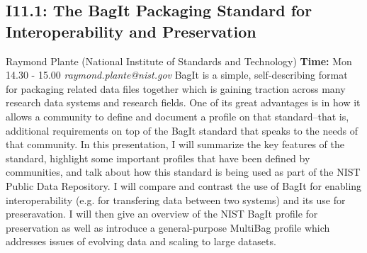 \documentclass{report}
\begin{document}
\subsection*{I11.1: The BagIt Packaging Standard for Interoperability and Preservation}
\bigskip
Raymond Plante (National Institute of Standards and Technology) \newline   \newline   \newline   \newline  \newline  \newline\newline
{\bf Time:} Mon 14.30 - 15.00\newline
\newline
{\it raymond.plante@nist.gov}\newline
\newline\newline
BagIt is a simple, self-describing format for packaging related data files together which is gaining traction across many research data systems and research fields.  One of its great advantages is in how it allows a community to define and document a profile on that standard--that is, additional requirements on top of the BagIt standard that speaks to the needs of that community.  In this presentation, I will summarize the key features of the standard, highlight some important profiles that have been defined by communities, and talk about how this standard is being used as part of the NIST Public Data Repository.  I will compare and contrast the use of BagIt for enabling interoperability (e.g. for transfering data between two systems) and its use for preseravation.  I will then give an overview of the NIST BagIt profile for preservation as well as introduce a general-purpose MultiBag profile which addresses issues of evolving data and scaling to large datasets.\newline
\newpage
\end{document}
